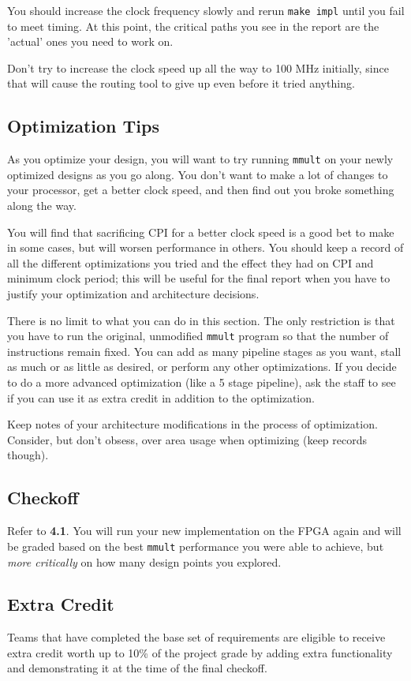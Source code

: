 You should increase the clock frequency slowly and rerun \verb|make impl| until you fail to meet timing.
At this point, the critical paths you see in the report are the 'actual' ones you need to work on.

Don't try to increase the clock speed up all the way to 100 MHz initially, since that will cause the routing tool to give up even before it tried anything.

\subsection{Optimization Tips}
As you optimize your design, you will want to try running \verb|mmult| on your newly optimized designs as you go along. You don't want to make a lot of changes to your processor, get a better clock speed, and then find out you broke something along the way.

You will find that sacrificing CPI for a better clock speed is a good bet to make in some cases, but will worsen performance in others.
You should keep a record of all the different optimizations you tried and the effect they had on CPI and minimum clock period; this will be useful for the final report when you have to justify your optimization and architecture decisions.

There is no limit to what you can do in this section.
The only restriction is that you have to run the original, unmodified \verb|mmult| program so that the number of instructions remain fixed.
You can add as many pipeline stages as you want, stall as much or as little as desired, or perform any other optimizations.
If you decide to do a more advanced optimization (like a 5 stage pipeline), ask the staff to see if you can use it as extra credit in addition to the optimization.

Keep notes of your architecture modifications in the process of optimization.
Consider, but don't obsess, over area usage when optimizing (keep records though).

\subsection{Checkoff}
Refer to \textbf{4.1}. You will run your new implementation on the FPGA again and will be graded based on the best \verb|mmult| performance you were able to achieve, but \textit{more critically} on how many design points you explored.



\subsection{Extra Credit}
\label{extra_credit}
Teams that have completed the base set of requirements are eligible to receive extra credit worth up to 10\% of the project grade by adding extra functionality and demonstrating it at the time of the final checkoff.

